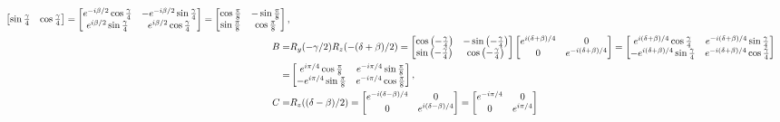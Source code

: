 \documentclass[en]{sol-man}
\begin{document}
\begin{sol}
\begin{align}
\begin{bmatrix}
            \sin\frac{\gamma}{4}&\cos\frac{\gamma}{4}
        \end{bmatrix}=\begin{bmatrix}
            e^{-i\beta/2}\cos\frac{\gamma}{4}&-e^{-i\beta/2}\sin\frac{\gamma}{4}\\
            e^{i\beta/2}\sin\frac{\gamma}{4}&e^{i\beta/2}\cos\frac{\gamma}{4}
        \end{bmatrix}=\begin{bmatrix}
            \cos\frac{\pi}{8}&-\sin\frac{\pi}{8}\\
            \sin\frac{\pi}{8}&\cos\frac{\pi}{8}
        \end{bmatrix},\\
        \notag B=&R_y(-\gamma/2)R_z(-(\delta+\beta)/2)=\begin{bmatrix}
            \cos\left(-\frac{\gamma}{4}\right)&-\sin\left(-\frac{\gamma}{4}\right)\\
            \sin\left(-\frac{\gamma}{4}\right)&\cos\left(-\frac{\gamma}{4}\right)
        \end{bmatrix}\begin{bmatrix}
            e^{i(\delta+\beta)/4}&0\\
            0&e^{-i(\delta+\beta)/4}
        \end{bmatrix}=\begin{bmatrix}
            e^{i(\delta+\beta)/4}\cos\frac{\gamma}{4}&e^{-i(\delta+\beta)/4}\sin\frac{\gamma}{4}\\
            -e^{i(\delta+\beta)/4}\sin\frac{\gamma}{4}&e^{-i(\delta+\beta)/4}\cos\frac{\gamma}{4}
        \end{bmatrix}\\
        =&\begin{bmatrix}
            e^{i\pi/4}\cos\frac{\pi}{8}&e^{-i\pi/4}\sin\frac{\pi}{8}\\
            -e^{i\pi/4}\sin\frac{\pi}{8}&e^{-i\pi/4}\cos\frac{\pi}{8}
        \end{bmatrix},\\
        C=&R_z((\delta-\beta)/2)=\begin{bmatrix}
            e^{-i(\delta-\beta)/4}&0\\
            0&e^{i(\delta-\beta)/4}
        \end{bmatrix}=\begin{bmatrix}
            e^{-i\pi/4}&0\\
            0&e^{i\pi/4}
        \end{bmatrix}
    \end{align}
\end{sol}
\end{document}
